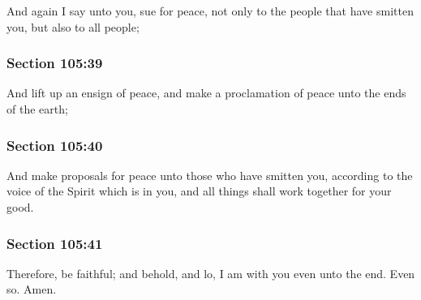 		And again I say unto you, sue for peace, not only to the people that have smitten you, but also to all people;


	\subsubsection{Section 105:39} %
		\label{DC105-39}

		And lift up an ensign of peace, and make a proclamation of peace unto the ends of the earth;


	\subsubsection{Section 105:40} %
		\label{DC105-40}

		And make proposals for peace unto those who have smitten you, according to the voice of the Spirit which is in you, and all things shall work together for your good.


	\subsubsection{Section 105:41} %
		\label{DC105-41}

		Therefore, be faithful; and behold, and lo, I am with you even unto the end.  Even so.  Amen.

